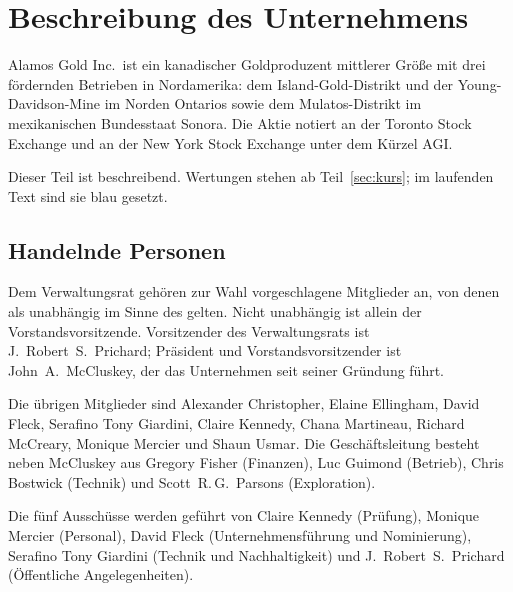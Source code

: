 \section{Beschreibung des Unternehmens}
\label{sec:unternehmen}

Alamos Gold Inc.\ ist ein kanadischer Goldproduzent mittlerer Gr\"o{\ss}e mit
drei f\"ordernden Betrieben in Nordamerika: dem Island-Gold-Distrikt und der
Young-Davidson-Mine im Norden Ontarios sowie dem Mulatos-Distrikt im
mexikanischen Bundesstaat Sonora. Die Aktie notiert an der
Toronto Stock Exchange und an der New York Stock Exchange unter dem K\"urzel
AGI.

Dieser Teil ist beschreibend. Wertungen stehen ab
Teil~\ref{sec:kurs}; im laufenden Text sind sie blau gesetzt.

\subsection{Handelnde Personen}

Dem Verwaltungsrat geh\"oren \DirektorenGesamt{} zur Wahl vorgeschlagene
Mitglieder an, von denen \DirektorenUnabh{} als unabh\"angig im Sinne des
\NIOffenlegung{} gelten. Nicht
unabh\"angig ist allein der Vorstandsvorsitzende. Vorsitzender des
Verwaltungsrats ist J.~Robert~S.\ Prichard; Pr\"asident und
Vorstandsvorsitzender ist John~A.\ McCluskey, der das Unternehmen seit seiner
Gr\"undung f\"uhrt.

Die \"ubrigen Mitglieder sind Alexander Christopher, Elaine Ellingham, David
Fleck, Serafino Tony Giardini, Claire Kennedy, Chana Martineau, Richard
McCreary, Monique Mercier und Shaun Usmar. Die
Gesch\"aftsleitung besteht neben McCluskey aus Gregory Fisher (Finanzen),
Luc Guimond (Betrieb), Chris Bostwick (Technik) und Scott~R.\,G.\ Parsons
(Exploration).


Die f\"unf Aussch\"usse werden gef\"uhrt von Claire Kennedy (Pr\"ufung),
Monique Mercier (Personal), David Fleck (Unternehmensf\"uhrung und
Nominierung), Serafino Tony Giardini (Technik und Nachhaltigkeit) und
J.~Robert~S.\ Prichard (\"Offentliche Angelegenheiten).


